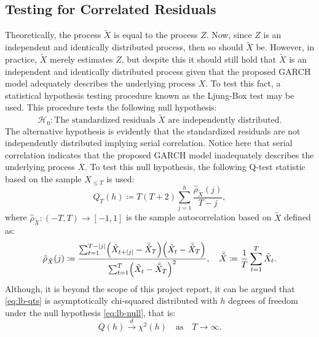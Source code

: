 \subsection{Testing for Correlated Residuals}
Theoretically, the process $\tilde{X}$ is equal to the process $Z$. Now, since $Z$ is an independent and identically distributed process, then so should $\tilde{X}$ be. However, in practice, $\tilde{X}$ merely estimates $Z$, but despite this it should still hold that $\tilde{X}$ is an independent and identically distributed process given that the proposed GARCH model adequately describes the underlying process $X$. To test this fact, a statistical hypothesis testing procedure known as the Ljung-Box test may be used. This procedure tests the following null hypothesis:
\begin{equation}\label{eq:lb-null}
    \mathcal{H}_{0}: \textrm{The standardized residuals $\tilde{X}$ are independently distributed}.
\end{equation}
The alternative hypothesis is evidently that the standardized residuals are not independently distributed implying serial correlation. Notice here that serial correlation indicates that the proposed GARCH model inadequately describes the underlying process $X$. To test this null hypothesis, the following Q-test statistic based on the sample $X_{\leq T}$ is used:
\begin{equation}\label{eq:lb-qts}
    Q_{T}(h)\coloneqq T(T+2)\sum_{j=1}^{h}\frac{\hat{\rho}_{\tilde{X}}(j)}{T-j},
\end{equation}
where $\hat{\rho}_{\tilde{X}}:(-T,T)\to[-1,1]$ is the sample autocorrelation based on $\tilde{X}$ defined as:
\begin{equation*}
    \hat{\rho}_{\tilde{X}}(j)\coloneqq\frac{\sum_{t=1}^{T-\abs{j}}\left(\tilde{X}_{t+\abs{j}}-\bar{\tilde{X}}_{T}\right)\left(\tilde{X}_{t}-\bar{\tilde{X}}_{T}\right)}{\sum_{t=1}^{T}\left(\tilde{X}_{t}-\bar{\tilde{X}}_{T}\right)^{2}},\quad \bar{\tilde{X}}\coloneqq\frac{1}{T}\sum_{t=1}^{T}\tilde{X}_{t}.
\end{equation*}
Although, it is beyond the scope of this project report, it can be argued that \eqref{eq:lb-qts} is asymptotically chi-squared distributed with $h$ degrees of freedom under the null hypothesis \eqref{eq:lb-null}, that is:
\begin{equation*}
    Q(h)\overset{d}{\to}\chi^{2}(h)\quad\textrm{as}\quad T\to\infty.
\end{equation*}

